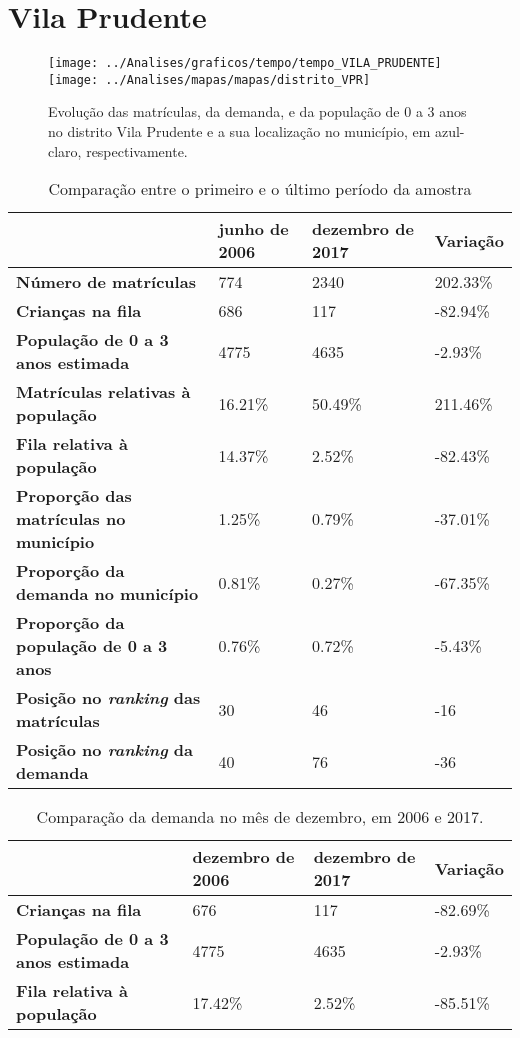 \section{Vila Prudente}
\begin{figure}[H]
\centering
\texttt{[image: ../Analises/graficos/tempo/tempo\_VILA\_PRUDENTE]}
\texttt{[image: ../Analises/mapas/mapas/distrito\_VPR]}
\caption{Evolução das matrículas, da demanda, e da população de 0 a 3 anos no distrito Vila Prudente e a sua localização no município, em azul-claro, respectivamente.}
\end{figure}
\begin{table}[H]
\begin{tabular}{l|l|l|l}
\textbf{}                                      & \textbf{junho de 2006}       & \textbf{dezembro de 2017}    & \textbf{Variação} \\ \hline
\textbf{Número de matrículas}                  & 774 & 2340 & 202.33\% \\ \hline
\textbf{Crianças na fila}                      & 686 & 117 & -82.94\% \\ \hline
\textbf{População de 0 a 3 anos estimada}      & 4775 & 4635 & -2.93\% \\ \hline
\textbf{Matrículas relativas à população}      & 16.21\% & 50.49\% & 211.46\% \\ \hline
\textbf{Fila relativa à população}             & 14.37\% & 2.52\% & -82.43\% \\ \hline
\textbf{Proporção das matrículas no município} & 1.25\% & 0.79\% & -37.01\% \\ \hline
\textbf{Proporção da demanda no município}     & 0.81\% & 0.27\% & -67.35\% \\ \hline
\textbf{Proporção da população de 0 a 3 anos}  & 0.76\% & 0.72\% & -5.43\% \\ \hline
\textbf{Posição no \textit{ranking} das matrículas}     & 30 & 46 & -16 \\ \hline
\textbf{Posição no \textit{ranking} da demanda}         & 40 & 76 & -36 \\ 
\end{tabular}
\caption{Comparação entre o primeiro e o último período da amostra}
\end{table}
\begin{table}[H]
\begin{tabular}{l|l|l|l}
\textbf{}                                 & \textbf{dezembro de 2006} & \textbf{dezembro de 2017} & \textbf{Variação} \\ \hline
\textbf{Crianças na fila}                      & 676 & 117 & -82.69\% \\ \hline
\textbf{População de 0 a 3 anos estimada}      & 4775 & 4635 & -2.93\% \\ \hline
\textbf{Fila relativa à população}             & 17.42\% & 2.52\% & -85.51\% \\
\end{tabular}
\caption{Comparação da demanda no mês de dezembro, em 2006 e 2017.}
\end{table}
